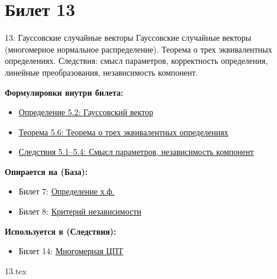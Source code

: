 \documentclass[a4paper, 12pt]{article}
\newcommand{\ticketsection}[1]{\vspace{0.5em}\noindent\textbf{\textcolor{ticketdark}{\sffamily #1}}\par}
\begin{document}
\section{Билет 13}
\begin{ticketskeleton}{13. Гауссовские случайные векторы}
     Гауссовские случайные векторы (многомерное нормальное распределение). Теорема о трех эквивалентных определениях. Следствия: смысл параметров, корректность определения, линейные преобразования, независимость компонент.

    \ticketsection{Формулировки внутри билета:}
    \begin{itemize}
        \item \hyperref[def:gaussian]{Определение 5.2: Гауссовский вектор}
        \item \hyperref[thm:three_def]{Теорема 5.6: Теорема о трех эквивалентных определениях}
        \item \hyperref[cor:gauss_props]{Следствия 5.1--5.4: Смысл параметров, независимость компонент}
    \end{itemize}

    \ticketsection{Опирается на (База):}
    \begin{itemize}
        \item Билет 7: \hyperref[def:char_func]{Определение х.ф.}
        \item Билет 8: \hyperref[thm:indep_crit]{Критерий независимости}
    \end{itemize}

    \ticketsection{Используется в (Следствия):}
    \begin{itemize}
        \item Билет 14: \hyperref[thm:multi_clt]{Многомерная ЦПТ}
    \end{itemize}
\end{ticketskeleton}

{13.tex}
\end{document}
